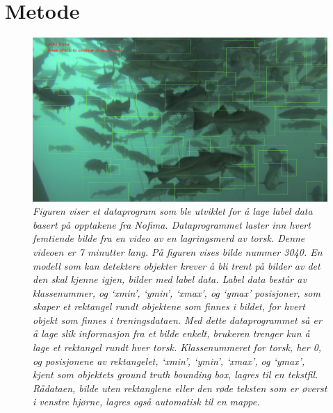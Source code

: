 


\section{Metode}

\begin{figure}[h!]
\begin{center} 
\includegraphics[scale=0.35]{figures/dataset_tool_2}
\caption{\small \sl Figuren viser et dataprogram som ble utviklet for å lage label data basert på opptakene fra Nofima. Dataprogrammet laster inn hvert femtiende bilde fra en video av en lagringsmerd av torsk. Denne videoen er 7 minutter lang. På figuren vises bilde nummer 3040. En modell som kan detektere objekter krever å bli trent på bilder av det den skal kjenne igjen, bilder med label data. Label data består av klassenummer, og `xmin', `ymin', `xmax', og `ymax' posisjoner, som skaper et rektangel rundt objektene som finnes i bildet, for hvert objekt som finnes i treningsdataen. Med dette dataprogrammet så er å lage slik informasjon fra et bilde enkelt, brukeren trenger kun å lage et rektangel rundt hver torsk. Klassenummeret for torsk, her 0, og posisjonene av rektangelet, `xmin', `ymin', `xmax', og `ymax', kjent som objektets ground truth bounding box, lagres til en tekstfil. Rådataen, bilde uten rektanglene eller den røde teksten som er øverst i venstre hjørne, lagres også automatisk til en mappe. \label{fig:dataset_tool}} 
\end{center} 
\end{figure} 

